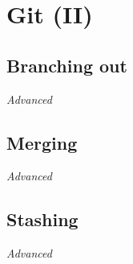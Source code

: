 \chapter{Git (II)}

\section{Branching out}

\textit{Advanced}
\vspace{6mm}

\section{Merging}

\textit{Advanced}
\vspace{6mm}

\section{Stashing}

\textit{Advanced}
\vspace{6mm}

